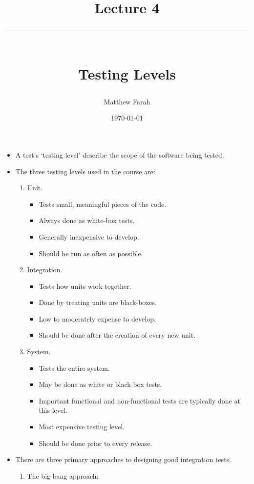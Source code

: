 \documentclass{article}
\date{
	\vspace{-.75em}
	{\large \today}
}
\title{
	\vspace*{-1.5em}
	{\Huge Lecture 4} \\
	\vspace{-1em}
	\rule{\textwidth/4}{.01em} \\
	\vspace{-.25em}
	{\Large Testing Levels}
	\vspace{-.75em}
}
\author{
	{\large Matthew Farah}
}
\begin{document}
\maketitle
\pagestyle{fancy}

\fi

\begin{itemize}
	\item A test's `testing level' describe the scope of the software being tested.
	\item The three testing levels used in the course are:
	\begin{enumerate}
		\item Unit.
		\begin{itemize}
			\item Tests small, meaningful pieces of the code.
			\item Always done as white-box tests.
			\item Generally inexpensive to develop.
			\item Should be run as often as possible.
		\end{itemize}
		\item Integration.
		\begin{itemize}
			\item Tests how units work together.
			\item Done by treating units are black-boxes.
			\item Low to moderately expense to develop.
			\item Should be done after the creation of every new unit.
		\end{itemize}
		\item System.
		\begin{itemize}
			\item Tests the entire system.
			\item May be done as white or black box tests.
			\item Important functional and non-functional tests are typically done at this level.
			\item Most expensive testing level.
			\item Should be done prior to every release.
		\end{itemize}
	\end{enumerate}
	\item There are three primary approaches to designing good integration tests.
	\begin{enumerate}
		\item The big-bang approach:
		\begin{itemize}

\end{itemize}
\end{enumerate}
\end{itemize}
\end{document}
